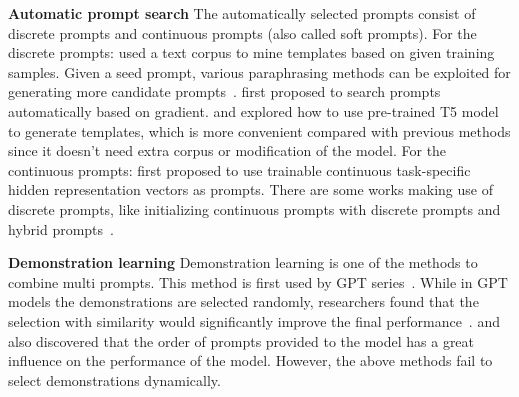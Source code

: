 \noindent
\textbf{Automatic prompt search}
The automatically selected prompts consist of discrete prompts and continuous prompts (also called soft prompts). For the discrete prompts: \citet{DBLP:journals/tacl/JiangXAN20} used a text corpus to mine templates based on given training samples. Given a seed prompt, various paraphrasing methods can be exploited for generating more candidate prompts~\citep{DBLP:journals/corr/abs-2106-11520, DBLP:conf/eacl/HavivBG21}. \citet{DBLP:conf/emnlp/WallaceFKGS19} first proposed to search prompts automatically based on gradient. \citet{DBLP:conf/acl/GaoFC20} and \citet{DBLP:journals/corr/abs-2102-12206} explored how to use pre-trained T5 model to generate templates, which is more convenient compared with previous methods since it doesn't need extra corpus or modification of the model. For the continuous prompts: \citet{DBLP:conf/acl/LiL20} first proposed to use trainable continuous task-specific hidden representation vectors as prompts. There are some works making use of discrete prompts, like initializing continuous prompts with discrete prompts and hybrid prompts~\citep{DBLP:conf/naacl/ZhongFC21, DBLP:conf/naacl/QinE21, DBLP:journals/corr/abs-2103-10385}. 

\noindent
\textbf{Demonstration learning}
Demonstration learning is one of the methods to combine multi prompts. This method is first used by GPT series~\citep{radford2019language, DBLP:conf/nips/BrownMRSKDNSSAA20}. While in GPT models the demonstrations are selected randomly, researchers found that the selection with similarity would significantly improve the final performance~\citep{DBLP:conf/acl/GaoFC20, DBLP:journals/corr/abs-2101-06804}. \citet{DBLP:journals/corr/abs-2101-06804} and ~\citet{DBLP:conf/acl/KumarT21} also discovered that the order of prompts provided to the model has a great influence on the performance of the model. However, the above methods fail to select demonstrations dynamically.